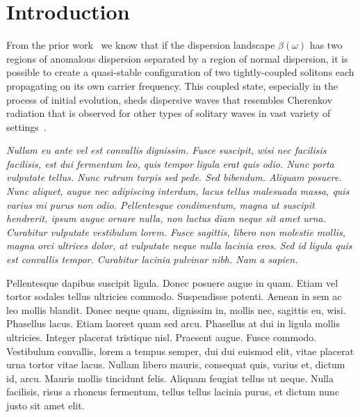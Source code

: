 \documentclass[aps, prl, twocolumn, superscriptaddress, final]{revtex4}
\begin{document}
\maketitle

\section{Introduction}

From the prior work~\cite{melchert2019soliton} we know that if the dispersion landscape $\beta(\omega)$ has two regions of anomalous dispersion separated by a region of normal dispersion, it is possible to create a quasi-stable configuration of two tightly-coupled solitons each propagating on its own carrier frequency. This coupled state, especially in the process of initial evolution, sheds dispersive waves that resembles Cherenkov radiation that is observed for other types of solitary waves in vast variety of settings~\cite{akhmediev1995cherenkov, afanasjev1996effect, driben2015resonant, conforti2015parametric, wright2015ultrabroadband, oreshnikov2017dispersive}.

{
  \it
Nullam eu ante vel est convallis dignissim.  Fusce suscipit, wisi nec facilisis facilisis, est dui fermentum leo, quis tempor ligula erat quis odio.  Nunc porta vulputate tellus.  Nunc rutrum turpis sed pede.  Sed bibendum.  Aliquam posuere.  Nunc aliquet, augue nec adipiscing interdum, lacus tellus malesuada massa, quis varius mi purus non odio.  Pellentesque condimentum, magna ut suscipit hendrerit, ipsum augue ornare nulla, non luctus diam neque sit amet urna.  Curabitur vulputate vestibulum lorem.  Fusce sagittis, libero non molestie mollis, magna orci ultrices dolor, at vulputate neque nulla lacinia eros.  Sed id ligula quis est convallis tempor.  Curabitur lacinia pulvinar nibh.  Nam a sapien.

Pellentesque dapibus suscipit ligula.  Donec posuere augue in quam.  Etiam vel tortor sodales tellus ultricies commodo.  Suspendisse potenti.  Aenean in sem ac leo mollis blandit.  Donec neque quam, dignissim in, mollis nec, sagittis eu, wisi.  Phasellus lacus.  Etiam laoreet quam sed arcu.  Phasellus at dui in ligula mollis ultricies.  Integer placerat tristique nisl.  Praesent augue.  Fusce commodo.  Vestibulum convallis, lorem a tempus semper, dui dui euismod elit, vitae placerat urna tortor vitae lacus.  Nullam libero mauris, consequat quis, varius et, dictum id, arcu.  Mauris mollis tincidunt felis.  Aliquam feugiat tellus ut neque.  Nulla facilisis, risus a rhoncus fermentum, tellus tellus lacinia purus, et dictum nunc justo sit amet elit.
}
\end{document}
